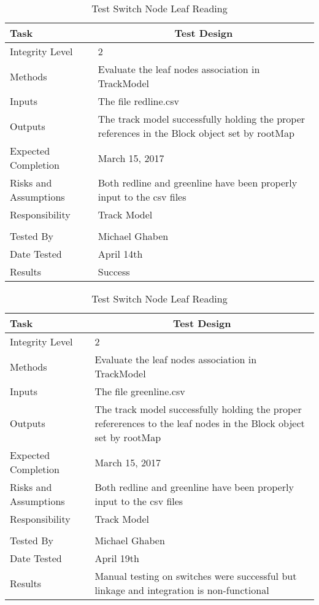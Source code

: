 \documentclass[]{article}
\begin{document}
\begin{table}[H]
	\centering
	\caption{Test Switch Node Leaf Reading}
	\begin{tabular}{|l|l|}
		\hline
		Task & \multicolumn{1}{c|}{Test Design} \\ \hline
		Integrity Level & 2 \\ \hline
		Methods & Evaluate the leaf nodes association in TrackModel\\ \hline
		Inputs &  The file redline.csv \\ \hline
		Outputs & \parbox[t]{10cm}{ The track model successfully holding the proper references in the Block object set by rootMap}\\ \hline
		Expected Completion & March 15, 2017\\ \hline
		Risks and Assumptions & Both redline and greenline have been properly input to the csv files \\ \hline
		Responsibility & Track Model\\ \hline
		\\ \hline
		Tested By   &  Michael Ghaben\\	\hline
		Date Tested & \parbox[t]{10cm}{April 14th}\\ \hline
		Results &Success\\ \hline
	\end{tabular}
\end{table}

\begin{table}[H]
	\centering
	\caption{Test Switch Node Leaf Reading}
	\begin{tabular}{|l|l|}
		\hline
		Task & \multicolumn{1}{c|}{Test Design} \\ \hline
		Integrity Level & 2 \\ \hline
		Methods & Evaluate the leaf nodes association in TrackModel\\ \hline
		Inputs &  The file greenline.csv \\ \hline
		Outputs &  \parbox[t]{10cm}{The track model successfully holding the proper refererences to the leaf nodes in the Block object set by rootMap}\\ \hline
		Expected Completion & March 15, 2017\\ \hline
		Risks and Assumptions & Both redline and greenline have been properly input to the csv files \\ \hline
		Responsibility & Track Model\\ \hline
		\\ \hline
		Tested By   &  Michael Ghaben\\	\hline
		Date Tested & \parbox[t]{10cm}{April 19th}\\ \hline
		Results & \parbox[t]{10cm}{Manual testing on switches were successful but linkage and integration is non-functional}\\ \hline
	\end{tabular}
\end{table}
\end{document}

